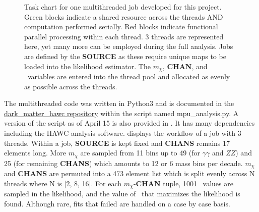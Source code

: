 \begin{figure}[h]
    \caption{Task chart for one multithreaded job developed for this project. Green blocks indicate a shared resource across the threads AND computation performed serially. Red blocks indicate functional parallel processing within each thread. 3 threads are represented here, yet many more can be employed during the full analysis. Jobs are defined by the \textbf{SOURCE} as these require unique maps to be loaded into the likelihood estimator. The $m_\chi$, \textbf{CHAN}, and \sv~variables are entered into the thread pool and allocated as evenly as possible across the threads.}
    \label{fig:mtd_multithreads}
\end{figure}

The multithreaded code was written in Python3 and is documented in the \href{https://gitlab.com/hawc-observatory/sandboxes/salaza82/dark\_matter\_hawc}{dark\_matter\_hawc repository} within the script named mpu\_analysis.py.
A version of the script as of April 15 is also provided in .
It has many dependencies including the HAWC analysis software.
 displays the workflow of a job with 3 threads.
Within a job, \textbf{SOURCE} is kept fixed and \textbf{CHANS} remains 17 elements long.
More $m_\chi$ are sampled from 11 bins up to 49 (for $\gamma\gamma$ and $ZZ$) and 25 (for remaining \textbf{CHANS}) which amounts to 12 or 6 mass bins per decade.
$m_\chi$ and \textbf{CHANS} are permuted into a 473 element list which is split evenly across N threads where N is [2, 8, 16].
For each $m_\chi$-\textbf{CHAN} tuple, 1001 \sv~values are sampled in the likelihood, and the value of \sv~that maximizes the likelihood is found.
Although rare, fits that failed are handled on a case by case basis.

